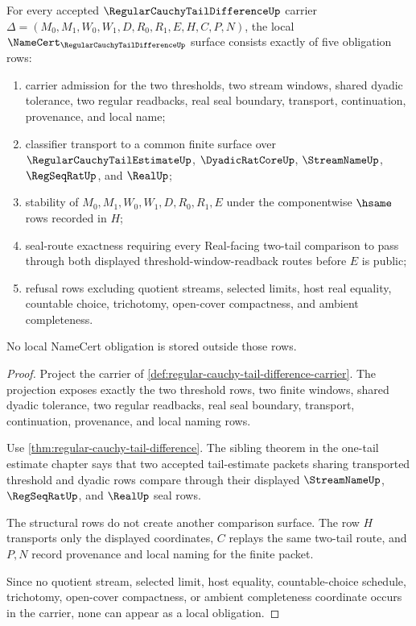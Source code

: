 \begin{theorem}
\label{thm:regular-cauchy-tail-difference-namecert-obligations}
For every accepted $\RegularCauchyTailDifferenceUp$ carrier
$\Delta=(M_0,M_1,W_0,W_1,D,R_0,R_1,E,H,C,P,N)$, the local
$\NameCert_{\RegularCauchyTailDifferenceUp}$ surface consists exactly of five
obligation rows:
\begin{enumerate}
\item carrier admission for the two thresholds, two stream windows, shared
dyadic tolerance, two regular readbacks, real seal boundary, transport,
continuation, provenance, and local name;
\item classifier transport to a common finite surface over
$\RegularCauchyTailEstimateUp$, $\DyadicRatCoreUp$, $\StreamNameUp$,
$\RegSeqRatUp$, and $\RealUp$;
\item stability of $M_0,M_1,W_0,W_1,D,R_0,R_1,E$ under the componentwise
$\hsame$ rows recorded in $H$;
\item seal-route exactness requiring every Real-facing two-tail comparison to
pass through both displayed threshold-window-readback routes before $E$ is
public;
\item refusal rows excluding quotient streams, selected limits, host real
equality, countable choice, trichotomy, open-cover compactness, and ambient
completeness.
\end{enumerate}
No local NameCert obligation is stored outside those rows.
\end{theorem}
\begin{proof}
Project the carrier of
\autoref{def:regular-cauchy-tail-difference-carrier}. The projection exposes
exactly the two threshold rows, two finite windows, shared dyadic tolerance,
two regular readbacks, real seal boundary, transport, continuation,
provenance, and local naming rows.

Use \autoref{thm:regular-cauchy-tail-difference}. The sibling theorem in the
one-tail estimate chapter says that two accepted tail-estimate packets sharing
transported threshold and dyadic rows compare through their displayed
$\StreamNameUp$, $\RegSeqRatUp$, and $\RealUp$ seal rows.

The structural rows do not create another comparison surface. The row $H$
transports only the displayed coordinates, $C$ replays the same two-tail route,
and $P,N$ record provenance and local naming for the finite packet.

Since no quotient stream, selected limit, host equality, countable-choice
schedule, trichotomy, open-cover compactness, or ambient completeness
coordinate occurs in the carrier, none can appear as a local obligation.
\end{proof}

